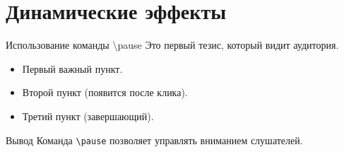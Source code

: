 \documentclass[10pt]{beamer}
\begin{document}
	
	\section{Динамические эффекты}
	
	\begin{frame}{Использование команды \textbackslash pause}
		Это первый тезис, который видит аудитория.
		\pause %
		
		\begin{itemize}
			\item Первый важный пункт. \pause
			\item Второй пункт (появится после клика). \pause
			\item Третий пункт (завершающий).
		\end{itemize}
		
		\pause
		\begin{block}{Вывод}
			Команда \texttt{\textbackslash pause} позволяет управлять вниманием слушателей.
		\end{block}
	\end{frame}
	
\end{document}
